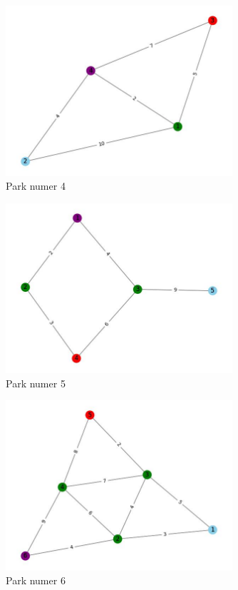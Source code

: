 \documentclass{article}
\begin{document}
\begin{figure}[h!]
\centering
\includegraphics[width=0.75\textwidth]{4.jpg}
\caption{Park numer 4}
\end{figure}
\begin{figure}[h!]
\centering
\includegraphics[width=0.75\textwidth]{5.jpg}
\caption{Park numer 5}
\end{figure}
\begin{figure}[h!]
\centering
\includegraphics[width=0.75\textwidth]{6.jpg}
\caption{Park numer 6}
\end{figure}
\end{document}
